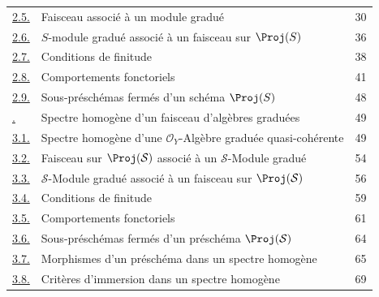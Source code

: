 \begin{longtable}{@{}p{}p{}r@{}}
\hyperref[subsection:II.2.5-fr]{2.5.} & Faisceau associé à un module gradué & 30\\
\hyperref[subsection:II.2.6-fr]{2.6.} & $S$-module gradué associé à un faisceau sur $\Proj(S)$ & 36\\
\hyperref[subsection:II.2.7-fr]{2.7.} & Conditions de finitude & 38\\
\hyperref[subsection:II.2.8-fr]{2.8.} & Comportements fonctoriels & 41\\
\hyperref[subsection:II.2.9-fr]{2.9.} & Sous-préschémas fermés d'un schéma $\Proj(S)$ & 48\\
\hyperref[section:II.3-fr]{\textsection3.} & Spectre homogène d'un faisceau d'algèbres graduées & 49\\
\hyperref[subsection:II.3.1-fr]{3.1.} & Spectre homogène d'une $\mathcal{O}_Y$-Algèbre graduée quasi-cohérente & 49\\
\hyperref[subsection:II.3.2-fr]{3.2.} & Faisceau sur $\Proj(\mathcal{S})$ associé à un $\mathcal{S}$-Module gradué & 54\\
\hyperref[subsection:II.3.3-fr]{3.3.} & $\mathcal{S}$-Module gradué associé à un faisceau sur $\Proj(\mathcal{S})$ & 56\\
\hyperref[subsection:II.3.4-fr]{3.4.} & Conditions de finitude & 59\\
\hyperref[subsection:II.3.5-fr]{3.5.} & Comportements fonctoriels & 61\\
\hyperref[subsection:II.3.6-fr]{3.6.} & Sous-préschémas fermés d'un préschéma $\Proj(\mathcal{S})$ & 64\\
\hyperref[subsection:II.3.7-fr]{3.7.} & Morphismes d'un préschéma dans un spectre homogène & 65\\
\hyperref[subsection:II.3.8-fr]{3.8.} & Critères d'immersion dans un spectre homogène & 69\\
\end{longtable}
